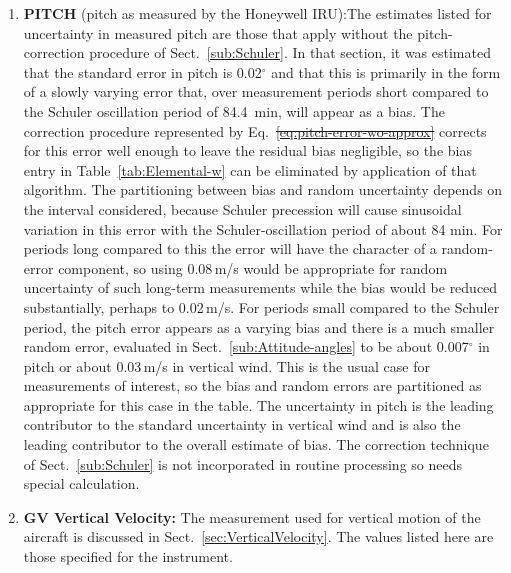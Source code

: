 \documentclass[12pt,twoside,english]{article}\usepackage[]{graphicx}\usepackage[]{color}
\let\OrgIndex\index
\renewcommand*{\index}[1]{\OrgIndex{#1}}
\providecommand{\DIFadd}[1]{{\protect\color{blue}\uwave{#1}}} %
\providecommand{\DIFdel}[1]{{\protect\color{red}\sout{#1}}}                      %
\providecommand{\DIFaddbegin}{} %
\providecommand{\DIFaddend}{} %
\providecommand{\DIFdelbegin}{} %
\providecommand{\DIFdelend}{} %
\begin{document}
{{\begin{enumerate}
\item \textbf{PITCH} (pitch as measured by the Honeywell IRU):The estimates listed for uncertainty in measured pitch are those that apply without the pitch-correction procedure of Sect.~\ref{sub:Schuler}. In that section, it was estimated that the standard error in pitch is 0.02$^{\circ}$ and that this is primarily in the form of a slowly varying error that, over measurement periods short compared to the Schuler oscillation period of 84.4~min, will appear as a bias. The correction procedure represented by Eq.~\DIFdelbegin \DIFdel{\ref{eq:pitch-error-wo-approx} }\DIFdelend \DIFaddbegin \DIFadd{\ref{eq:final-answer} }\DIFaddend corrects for this error well enough to leave the residual bias negligible, so the bias entry in Table~\ref{tab:Elemental-w} can be eliminated by application of that algorithm. The partitioning between bias and random uncertainty depends on the interval considered, because Schuler precession will cause sinusoidal variation in this error with the Schuler-oscillation period of about 84 min. For periods long compared to this the error will have the character of a random-error component, so using 0.08\,m/s would be appropriate for random uncertainty of such long-term measurements while the bias would be reduced substantially, perhaps to 0.02\,m/s. For periods small compared to the Schuler period, the pitch error appears as a varying bias and there is a much smaller random error, evaluated in Sect.~\ref{sub:Attitude-angles} to be about 0.007$^{\circ}$ in pitch or about 0.03\,m/s in vertical wind. This is the usual case for measurements of interest, so the bias and random errors are partitioned as appropriate for this case in the table. The uncertainty in pitch is the leading contributor to the standard uncertainty in vertical wind and is also the leading contributor to the overall estimate of bias. The correction technique of Sect.~\ref{sub:Schuler} is not incorporated in routine processing so needs special calculation.  
\item \textbf{GV Vertical Velocity:} The measurement used for vertical motion of the aircraft is discussed in Sect.~\ref{sec:VerticalVelocity}. The values listed here are those specified for the instrument.

\end{enumerate}}}
\end{document}
